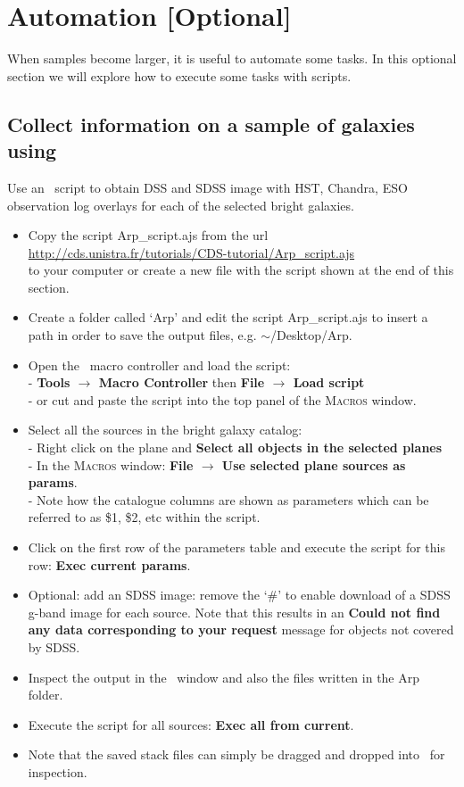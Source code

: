 \documentclass [a4paper, 12pt]{article}
\begin{document}
\section{Automation [Optional]}
When samples become larger, it is useful to automate some tasks. In this
optional section we will explore how to execute some tasks with
scripts.

\subsection{Collect information on a sample of galaxies using \aladin}

Use an \aladin\ script to obtain DSS and SDSS image with HST, Chandra, ESO
observation log overlays for each of the selected bright galaxies.
\renewcommand\UrlFont{\color{blue}\rmfamily}
\begin{itemize}
    \item Copy the script Arp\_script.ajs from the url \\
    \url{http://cds.unistra.fr/tutorials/CDS-tutorial/Arp_script.ajs} \\
     to your computer or create a new file with the script shown at the end
    of this section.
    \item Create a folder called `Arp' and edit the script Arp\_script.ajs to
    insert a path in order to save the output files, e.g. $\sim$/Desktop/Arp.
    \item Open the \aladin\ macro controller and load the script:\\
    - \textbf{Tools $\rightarrow$ Macro Controller} then \textbf{File
    $\rightarrow$ Load script}\\
    - or cut and paste the script into the top panel of the \textsc{Macros}
    window.
    \item Select all the sources in the bright galaxy catalog:\\
    - Right click on the plane and \textbf{Select all objects in the selected
    planes}\\
    - In the \textsc{Macros} window: \textbf{File $\rightarrow$ Use selected
    plane sources as params}.\\
    - Note how the catalogue columns are shown as parameters which can be
    referred to as \$1, \$2, etc within the script.
    \item Click on the first row of the parameters table and execute the
script
    for this row: \textbf{Exec current params}.
    \item Optional: add an SDSS image: remove the `\#' to enable download of a
    SDSS g-band image for each source. Note that this results in an
    \textbf{Could not find any data corresponding to your request} message for
    objects not covered by SDSS.
    \item Inspect the output in the \aladin\ window and also the files written
    in the Arp folder.
    \item Execute the script for all sources: \textbf{Exec all from current}.
    \item Note that the saved stack files can simply be dragged and dropped
    into \aladin\ for inspection.
\end{itemize}
\end{document}

